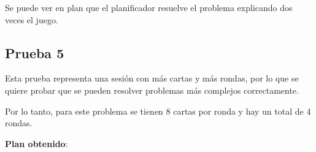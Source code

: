 \documentclass{uc3mpracticas}
\begin{document}
  Se puede ver en plan que el planificador resuelve el problema explicando dos veces el juego.

  \newpage

  \subsection{Prueba 5}

  Esta prueba representa una sesión con más cartas y más rondas, por lo que se quiere probar que se pueden resolver problemas más complejos correctamente.

  \vspace{3mm}

  Por lo tanto, para este problema se tienen 8 cartas por ronda y hay un total de 4 rondas.

  \vspace{3mm}

    \textbf{Plan obtenido}:
\end{document}
